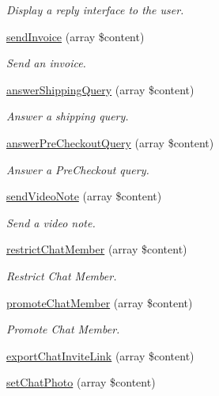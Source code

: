 \begin{DoxyCompactItemize}
\begin{DoxyCompactList}\small\item\em Display a reply interface to the user. \end{DoxyCompactList}\item 
\hyperlink{class_telegram_ae2c4d7308afec34759ccafe4a4f83053}{send\-Invoice} (array \$content)
\begin{DoxyCompactList}\small\item\em Send an invoice. \end{DoxyCompactList}\item 
\hyperlink{class_telegram_a7f8d89bb5061feb40973d2ac31b10a5a}{answer\-Shipping\-Query} (array \$content)
\begin{DoxyCompactList}\small\item\em Answer a shipping query. \end{DoxyCompactList}\item 
\hyperlink{class_telegram_a9eb2fa2623f2cd4f360f5b13fc4bfc73}{answer\-Pre\-Checkout\-Query} (array \$content)
\begin{DoxyCompactList}\small\item\em Answer a Pre\-Checkout query. \end{DoxyCompactList}\item 
\hyperlink{class_telegram_ab40154a0f3a51a0e308ca40cdc0bbdd0}{send\-Video\-Note} (array \$content)
\begin{DoxyCompactList}\small\item\em Send a video note. \end{DoxyCompactList}\item 
\hyperlink{class_telegram_aa0c71f6fb724e8515f0b36eb5cca0bac}{restrict\-Chat\-Member} (array \$content)
\begin{DoxyCompactList}\small\item\em Restrict Chat Member. \end{DoxyCompactList}\item 
\hyperlink{class_telegram_a2021787930735bb9c4ee22b07943447b}{promote\-Chat\-Member} (array \$content)
\begin{DoxyCompactList}\small\item\em Promote Chat Member. \end{DoxyCompactList}\item 
\hyperlink{class_telegram_ab0bd8531ee91c28e85fce5f3af515ae3}{export\-Chat\-Invite\-Link} (array \$content)
\item 
\hyperlink{class_telegram_a2c19ab9430d547b68e78cbe8f9870c04}{set\-Chat\-Photo} (array \$content)

\end{DoxyCompactItemize}
